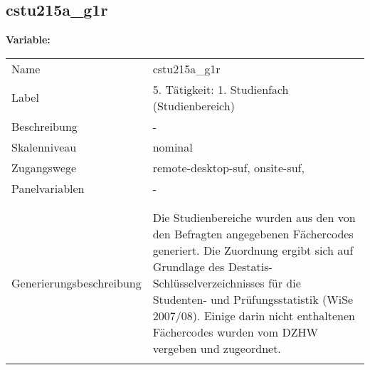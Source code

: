 	
	
	\subsection{cstu215a\_g1r}
	\label{subSection:cstu215a_g1r}

	\noindent\textbf{Variable:}\\
		\begin{tabular}{lL{11.3cm}}
			\label{tableVariable:cstu215a_g1r}
			Name & cstu215a\_g1r \\
			Label & 5. Tätigkeit: 1. Studienfach (Studienbereich) \\
			Beschreibung & - \\
			Skalenniveau & nominal \\
			Zugangswege &
				remote-desktop-suf,
				onsite-suf,
 \\
			Panelvariablen & -
			 \\
			 \\
 \\
					Generierungsbeschreibung & Die Studienbereiche wurden aus den von den Befragten angegebenen Fächercodes generiert. Die Zuordnung ergibt sich auf Grundlage des Destatis-Schlüsselverzeichnisses für die Studenten- und Prüfungsstatistik (WiSe 2007/08). Einige darin nicht enthaltenen Fächercodes wurden vom DZHW vergeben und zugeordnet. 
				 \\	
			 \\
		\end{tabular}






